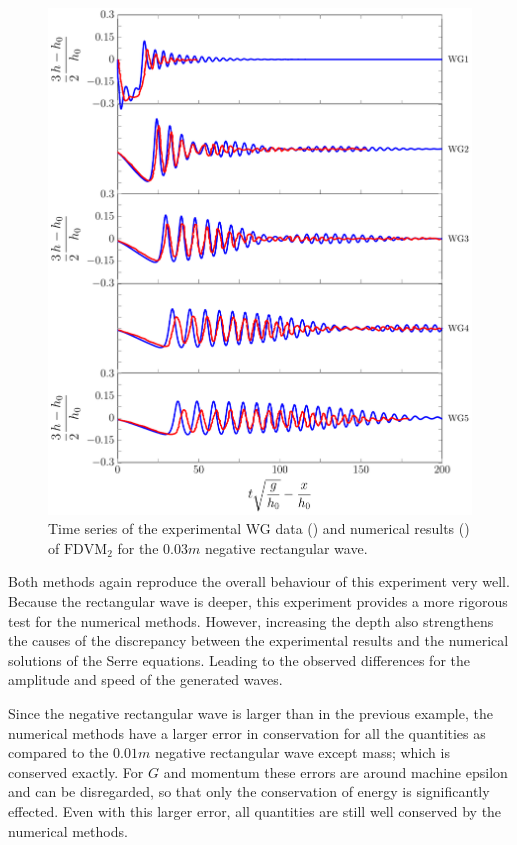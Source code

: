 \begin{figure}
	\centering
	\includegraphics[width=\textwidth]{./chp6/figures/Experiment/Segur/LongWGsFDVM3cm.pdf}
	\caption{Time series of the experimental WG data ({\color{red}\solidrule}) and numerical results ({\color{blue}\solidrule}) of $\text{FDVM}_2$ for the $0.03m$ negative rectangular wave.}
	\label{fig:Segur3cmFDVM}
\end{figure} 

Both methods again reproduce the overall behaviour of this experiment very well. Because the rectangular wave is deeper, this experiment provides a more rigorous test for the numerical methods. However, increasing the depth also strengthens the causes of the discrepancy between the experimental results and the numerical solutions of the Serre equations. Leading to the observed differences for the amplitude and speed of the generated waves.

Since the negative rectangular wave is larger than in the previous example, the numerical methods have a larger error in conservation for all the quantities as compared to the $0.01m$ negative rectangular wave except mass; which is conserved exactly. For $G$ and momentum these errors are around machine epsilon and can be disregarded, so that only the conservation of energy is significantly effected. Even with this larger error, all quantities are still well conserved by the numerical methods. 

